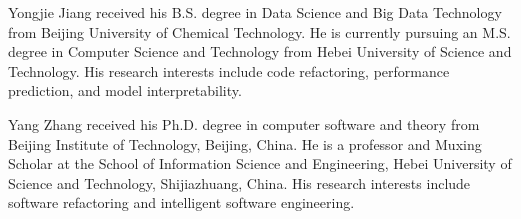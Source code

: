 \documentclass[journal]{IEEEtran}
\begin{document}
\vspace{-25pt} 
\begin{IEEEbiographynophoto}{Yongjie Jiang}
received his B.S. degree in Data Science and Big Data Technology from Beijing University of Chemical Technology. He is currently pursuing an M.S. degree in Computer Science and Technology from Hebei University of Science and Technology. His research interests include code refactoring, performance prediction, and model interpretability.
\end{IEEEbiographynophoto}
\vspace{-25pt} 
\begin{IEEEbiographynophoto}{Yang Zhang}
received his Ph.D. degree in computer software and theory from Beijing Institute of Technology, Beijing, China. He is a professor and Muxing Scholar at the School of Information Science and Engineering, Hebei University of Science and Technology, Shijiazhuang, China. His research interests include software refactoring and intelligent software engineering.
\end{IEEEbiographynophoto}
\vspace{-25pt} 
\end{document}
